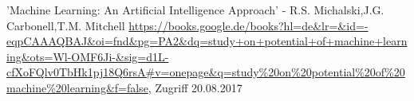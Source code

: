 \begin{thebibliography}{999}
 'Machine Learning: An Artificial Intelligence Approach' - R.S. Michalski,J.G. Carbonell,T.M. Mitchell \url{https://books.google.de/books?hl=de&lr=&id=-eqpCAAAQBAJ&oi=fnd&pg=PA2&dq=study+on+potential+of+machine+learning&ots=Wl-OMF6Ji-&sig=d1L-cfXoFQlv0TbHk1pj18Q6rsA#v=onepage&q=study\%20on\%20potential\%20of\%20machine\%20learning&f=false}, Zugriff 20.08.2017

\end{thebibliography}
